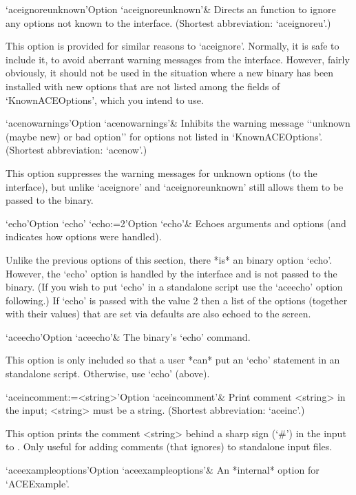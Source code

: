 \>`aceignoreunknown'{Option `aceignoreunknown'}&
Directs an {\ACE} function to  ignore  any  options  not known to the
{\ACE} interface.
(Shortest abbreviation: `aceignoreu'.)

This option is provided for similar reasons to `aceignore'.  Normally,
it is safe to include it, to avoid aberrant warning messages from  the
{\ACE} interface. However, fairly obviously, it should not be used  in
the situation where a new {\ACE} binary has been  installed  with  new
options that are not listed among  the  fields  of  `KnownACEOptions',
which you intend to use.

\>`acenowarnings'{Option `acenowarnings'}& 
Inhibits the warning message \lq{}`unknown (maybe new) or bad option''
for options not listed in `KnownACEOptions'.
(Shortest abbreviation: `acenow'.)

This option suppresses the warning messages for  unknown  options  (to
the {\ACE} interface), but unlike `aceignore'  and  `aceignoreunknown'
still allows them to be passed to the {\ACE} binary.

\>`echo'{Option `echo'} 
\>`echo:=2'{Option `echo'}& 
Echoes arguments and options (and indicates how options were handled).

Unlike the previous options of this  section,  there  *is*  an  {\ACE}
binary option `echo'. However, the `echo' option  is  handled  by  the
{\ACE} interface and is not passed to the {\ACE} binary. (If you  wish
to put  `echo'  in  a  standalone  script  use  the  `aceecho'  option
following.) If `echo' is passed with the value 2 then a  list  of  the
options (together with their values) that are set via {\ACE}  defaults
are also echoed to the screen.

\>`aceecho'{Option `aceecho'}& 
The {\ACE} binary's `echo' command.

This option is only included so  that  a  user  *can*  put  an  `echo'
statement in  an  {\ACE}  standalone  script.  Otherwise,  use  `echo'
(above).

\>`aceincomment:=<string>'{Option `aceincomment'}&
Print comment <string> in the {\ACE} input; <string> must be a string.
(Shortest abbreviation: `aceinc'.)

This option prints the comment <string> behind a sharp sign (`\#')  in
the input to {\ACE}. Only useful  for  adding  comments  (that  {\ACE}
ignores) to standalone input files.

\>`aceexampleoptions'{Option `aceexampleoptions'}&
An *internal* option for `ACEExample'.

